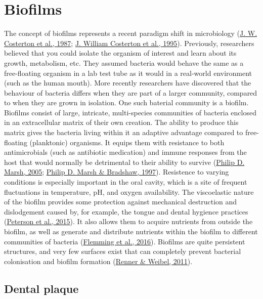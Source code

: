 \documentclass[
  letterpaper,
]{book}
\begin{document}
\hypertarget{biofilms}{%
\section{Biofilms}\label{biofilms}}

The concept of biofilms represents a recent paradigm shift in
microbiology (\protect\hyperlink{ref-costertonBacterialBiofilms1987}{J.
W. Costerton et al., 1987};
\protect\hyperlink{ref-costertonMicrobialBiofilms1995}{J. William
Costerton et al., 1995}). Previously, researchers believed that you
could isolate the organism of interest and learn about its growth,
metabolism, etc. They assumed bacteria would behave the same as a
free-floating organism in a lab test tube as it would in a real-world
environment (such as the human mouth). More recently researchers have
discovered that the behaviour of bacteria differs when they are part of
a larger community, compared to when they are grown in isolation. One
such baterial community is a biofilm. Biofilms consist of large,
intricate, multi-species communities of bacteria enclosed in an
extracellular matrix of their own creation. The ability to produce this
matrix gives the bacteria living within it an adaptive advantage
compared to free-floating (planktonic) organisms. It equips them with
resistance to both antimicrobials (such as antibiotic medication) and
immune responses from the host that would normally be detrimental to
their ability to survive
(\protect\hyperlink{ref-marshDentalPlaque2005}{Philip D. Marsh, 2005};
\protect\hyperlink{ref-marshPhysiologicalApproaches1997}{Philip D. Marsh
\& Bradshaw, 1997}). Resistence to varying conditions is especially
important in the oral cavity, which is a site of frequent fluctuations
in temperature, pH, and oxygen availability. The viscoelastic nature of
the biofilm provides some protection against mechanical destruction and
dislodgement caused by, for example, the tongue and dental hygience
practices
(\protect\hyperlink{ref-petersonViscoelasticityBiofilms2015}{Peterson et
al., 2015}). It also allows them to acquire nutrients from outside the
biofilm, as well as generate and distribute nutrients within the biofilm
to different communities of bacteria
(\protect\hyperlink{ref-flemmingBiofilmsEmergent2016}{Flemming et al.,
2016}). Biofilms are quite persistent structures, and very few surfaces
exist that can completely prevent bacterial colonisation and biofilm
formation
(\protect\hyperlink{ref-rennerPhysicochemicalRegulation2011}{Renner \&
Weibel, 2011}).

\hypertarget{dental-plaque}{%
\subsection{Dental plaque}\label{dental-plaque}}
\end{document}

